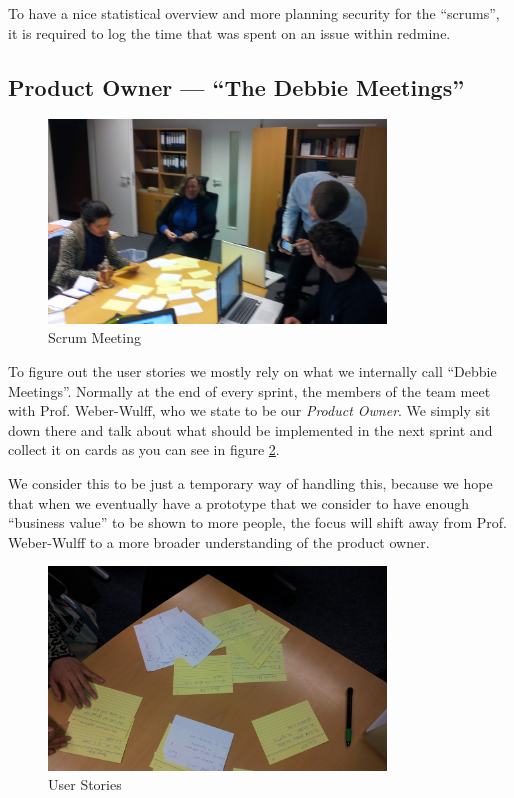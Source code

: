 To have a nice statistical overview and more planning security for the \enquote{scrums}, it is required to log the time 
that was spent on an issue within redmine.


\subsection{Product Owner --- \enquote{The Debbie Meetings}}

\begin{figure}[!h]
  \centering
    \includegraphics[width=0.8\textwidth]{images/2011-11-15-user-stories-6.jpg}
  \caption{Scrum Meeting}
  \label{fig:scrumming}
\end{figure}

To figure out the user stories we mostly rely on what we internally call \enquote{Debbie Meetings}.
Normally at the end of every sprint, the members of the team meet with Prof. Weber-Wulff, who we state to be our \textit{Product
Owner}. We simply sit down there and talk about what should be implemented in the next sprint and collect it on cards as
you can see in figure \ref{fig:userStories}.

We consider this to be just a temporary way of handling this, because we hope that when we eventually have a prototype 
that we consider to have enough \enquote{business value} to be shown to more people, the focus will shift away from 
Prof. Weber-Wulff to a more broader understanding of the product owner. 

\begin{figure}[!h]
  \centering
    \includegraphics[width=0.8\textwidth]{images/2011-11-15-user-stories-4.jpg}
  \caption{User Stories}
  \label{fig:userStories}
\end{figure}

